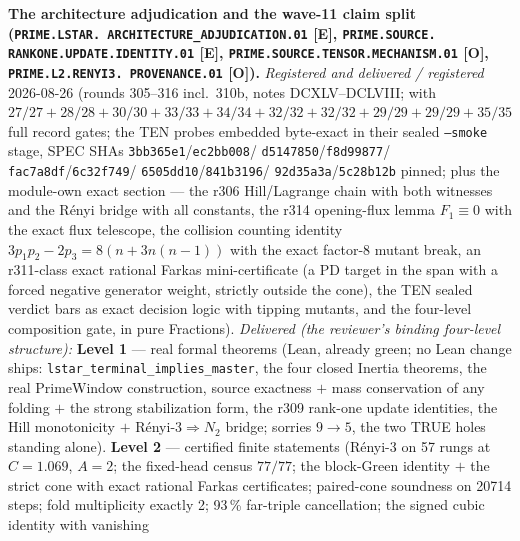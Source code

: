 \par\smallskip\noindent\textbf{The architecture adjudication and
the wave-11 claim split (\texttt{PRIME.LSTAR.\allowbreak
ARCHITECTURE\_ADJUDICATION.01} [E], \texttt{PRIME.SOURCE.\allowbreak
RANKONE.\allowbreak UPDATE.\allowbreak IDENTITY.01} [E],
\texttt{PRIME.SOURCE.\allowbreak TENSOR.\allowbreak MECHANISM.01}
[O], \texttt{PRIME.L2.\allowbreak RENYI3.\allowbreak
PROVENANCE.01} [O]).}
{\sloppy
\emph{Registered and delivered / registered} 2026-08-26 (rounds
305--316 incl.\ 310b, notes DCXLV--DCLVIII;
 with $27/27 + 28/28 +
30/30 + 33/33 + 34/34 + 32/32 + 32/32 + 29/29 + 29/29 + 35/35$
full record gates; the TEN probes embedded byte-exact in their
sealed \texttt{--smoke} stage, SPEC SHAs
\texttt{3bb365e1}/\allowbreak\texttt{ec2bb008}/\allowbreak
\texttt{d5147850}/\allowbreak\texttt{f8d99877}/\allowbreak
\texttt{fac7a8df}/\allowbreak\texttt{6c32f749}/\allowbreak
\texttt{6505dd10}/\allowbreak\texttt{841b3196}/\allowbreak
\texttt{92d35a3a}/\allowbreak\texttt{5c28b12b} pinned; plus the
module-own exact section --- the
r306 Hill/Lagrange chain with both witnesses and the R\'enyi bridge
with all constants, the r314 opening-flux lemma $F_1 \equiv 0$ with
the exact flux telescope, the collision counting identity
$3p_1p_2 - 2p_3 = 8(n + 3n(n{-}1))$ with the exact factor-8 mutant
break, an r311-class exact rational Farkas mini-certificate (a PD
target in the span with a forced negative generator weight,
strictly outside the cone), the TEN sealed verdict bars as exact
decision logic with tipping mutants, and the four-level
composition gate, in pure Fractions).  \emph{Delivered (the
reviewer's binding four-level structure):} \textbf{Level 1} ---
real formal theorems (Lean, already green; no Lean change ships:
\texttt{lstar\_terminal\_implies\_master}, the four closed Inertia
theorems, the real PrimeWindow construction, source exactness $+$
mass conservation of any folding $+$ the strong stabilization
form, the r309 rank-one update identities, the Hill monotonicity
$+$ R\'enyi-3${}\Rightarrow N_2$ bridge; sorries $9 \to 5$, the
two TRUE holes standing alone).  \textbf{Level 2} --- certified
finite statements (R\'enyi-3 on 57 rungs at $C = 1.069$, $A = 2$;
the fixed-head census $77/77$; the block-Green identity $+$ the
strict cone with exact rational Farkas certificates; paired-cone
soundness on 20714 steps; fold multiplicity exactly 2; 93\,\%
far-triple cancellation; the signed cubic identity with vanishing
}
